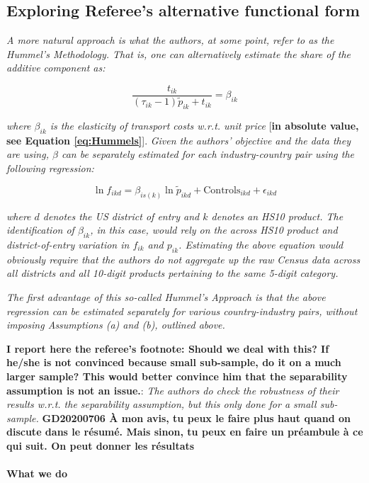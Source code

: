 \documentclass[a4paper,12pt]{article}
\begin{document}
\subsection{Exploring Referee's alternative functional form}


\textit{A more natural approach is what the authors, at some point, refer to as the
Hummel's Methodology. That is, one can alternatively estimate the share of the
additive component as:}

$$\frac{t_{ik}}{ (\tau_{ik}-1)\tilde{p}_{ik} + t_{ik}} = \beta_{ik}$$

\textit{where $\beta_{ik}$ is the elasticity of transport costs w.r.t. unit price} [\textbf{in absolute value, see Equation \ref{eq:Hummels}}]. \textit{Given the authors' objective and the data they are using, $\beta$ can be separately estimated
for each industry-country pair using the following regression:}

\begin{equation}
\ln f_{ikd} = \beta_{is(k)}\ln \tilde{p}_{ikd} + \text{Controls}_{ikd} +\epsilon_{ikd} \label{eq:estimation_ref1}
\end{equation}

\textit{where $d$ denotes the US district of entry and $k$ denotes an HS10 product. The
identification of $\beta_{ik}$, in this case, would rely on the across HS10 product and
district-of-entry variation in $f_{ik}$ and $p_{ik}$. Estimating the above equation would
obviously require that the authors do not aggregate up the raw Census data
across all districts and all 10-digit products pertaining to the same 5-digit category.}

\textit{The first advantage of this so-called Hummel's Approach is that the above
regression can be estimated separately for various country-industry pairs, without
imposing Assumptions (a) and (b), outlined above.}

\textbf{I report here the referee's footnote: Should we deal with this? If he/she is not convinced because small sub-sample, do it on a much larger sample? This would better convince him that the separability assumption is not an issue.}: \textit{The authors do check the robustness of their results w.r.t. the separability assumption, but this only done for a small sub-sample.} \textbf{GD20200706 À mon avis, tu peux le faire plus haut quand on discute dans le résumé. Mais sinon, tu peux en faire un préambule à ce qui suit. On peut donner les résultats}

\paragraph{What we do}
\end{document}
